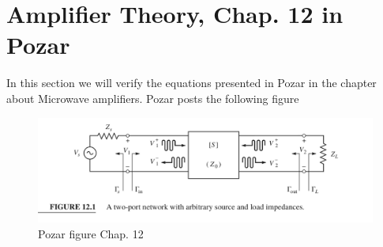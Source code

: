 \documentclass{article}
\begin{document}
\section{Amplifier Theory, Chap. 12 in Pozar}
In this section we will verify the equations presented in Pozar in the chapter about Microwave amplifiers.
Pozar posts the following figure
\begin{figure}[H]
 \includegraphics[width=\linewidth]{Pozar1.png}
  \caption{Pozar figure Chap. 12}
  \label{fig4}
\end{figure}
\end{document}
